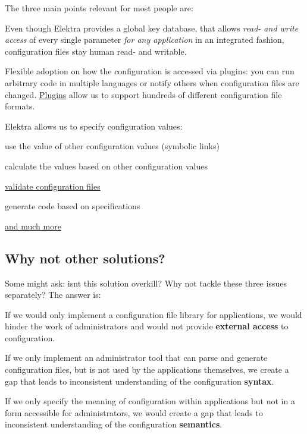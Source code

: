 The three main points relevant for most people are\+:


\begin{DoxyEnumerate}
\item Even though Elektra provides a global key database, that allows {\itshape read-\/ and write access} of every single parameter {\itshape for any application} in an integrated fashion, configuration files stay human read-\/ and writable.
\item Flexible adoption on how the configuration is accessed via plugins\+: you can run arbitrary code in multiple languages or notify others when configuration files are changed. \hyperlink{md_src_plugins_README_src_plugins_README_md}{Plugins} allow us to support hundreds of different configuration file formats.
\item Elektra allows us to specify configuration values\+:
\begin{DoxyItemize}
\item use the value of other configuration values (symbolic links)
\item calculate the values based on other configuration values
\item \hyperlink{md_doc_tutorials_validation_doc_tutorials_validation_md}{validate configuration files}
\item generate code based on specifications
\item \hyperlink{md_src_plugins_README_src_plugins_README_md}{and much more}
\end{DoxyItemize}
\end{DoxyEnumerate}

\subsection*{Why not other solutions?}

Some might ask\+: isn\textquotesingle{}t this solution overkill? Why not tackle these three issues separately? The answer is\+:


\begin{DoxyEnumerate}
\item If we would only implement a configuration file library for applications, we would hinder the work of administrators and would not provide {\bfseries external access} to configuration.
\item If we only implement an administrator tool that can parse and generate configuration files, but is not used by the applications themselves, we create a gap that leads to inconsistent understanding of the configuration {\bfseries syntax}.
\item If we only specify the meaning of configuration within applications but not in a form accessible for administrators, we would create a gap that leads to inconsistent understanding of the configuration {\bfseries semantics}.
\end{DoxyEnumerate}


